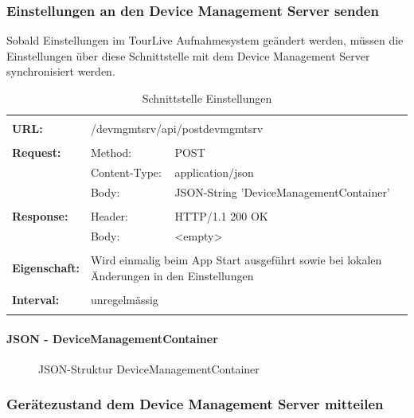 \subsubsection{Einstellungen an den Device Management Server senden}
Sobald  Einstellungen im TourLive Aufnahmesystem geändert werden, müssen die Einstellungen über diese Schnittstelle mit dem Device Management Server synchronisiert werden.

{\renewcommand{\arraystretch}{1}
\begin{longtable}{ p{2.5cm} || p{3.5cm} p{5.5cm}}
&  \\ [-1.5ex]
	\textbf{URL:} & \multicolumn{2}{l}{/devmgmtsrv/api/postdevmgmtsrv} \\ [1ex] \hline & &  \\ [-1.5ex]
	\textbf{Request:} & Method: & POST \\
		& Content-Type: & application/json \\
		& Body: & JSON-String 'DeviceManagementContainer' \\ [1ex] \hline & &  \\ [-1.5ex]
	\textbf{Response:} &  Header: & HTTP/1.1 200 OK \\
		& Body: & <empty>	 \\ [1ex] \hline & &  \\ [-1.5ex]
	\textbf{Eigenschaft:} & \multicolumn{2}{p{9cm}}{Wird einmalig beim App Start ausgeführt sowie bei lokalen Änderungen in den Einstellungen}  \\ [1ex] \hline & &  \\ [-1.5ex]
	\textbf{Interval:} & \multicolumn{2}{p{9cm}}{unregelmässig}  \\ [1ex] 
	
\caption{Schnittstelle Einstellungen}
\end{longtable}}

\paragraph{JSON - DeviceManagementContainer}
\begin{figure}[H]
	\centering
	
	\caption{JSON-Struktur DeviceManagementContainer}
\end{figure}

\subsubsection{Gerätezustand dem Device Management Server mitteilen}


